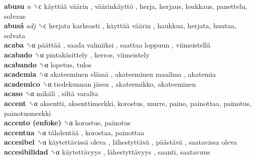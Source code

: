\textbf{abusu} \emph{n}  ␝ϲ   käyttää väärin ,  väärinkäyttö , herja, herjaus, loukkaus, panettelu, solvaus  \\
\textbf{abusá} \emph{adj}  ␝ϲ   herjata karkeasti ,  käyttää väärin , haukkua, herjata, huutaa, solvata  \\
\textbf{acaba} ␝α   päättää ,  saada valmiiksi ,  saattaa loppuun ,  viimeistellä   \\
\textbf{acabado} ␝α   pintakäsittely , kerros, viimeistely  \\
\textbf{acabando} ␝α  lopetus, tulos  \\
\textbf{academia} ␝α   akateeminen elämä ,  akateeminen maailma , akatemia  \\
\textbf{academico} ␝α   tiedekunnan jäsen , akateemikko, akateeminen  \\
\textbf{acaso} ␝α   mikäli ,  siltä varalta   \\
\textbf{accent} ␝α  aksentti, aksenttimerkki, korostus, murre, paino, painottaa, painotus, painotusmerkki  \\
\textbf{accento (enfoke)} ␝α  korostus, painotus  \\
\textbf{accentua} ␝α   tähdentää , korostaa, painottaa  \\
\textbf{accesibel} ␝α   käytettävissä oleva ,  lähestyttävä ,  päästävä ,  saatavissa oleva   \\
\textbf{accesibilidad} ␝α   käytettävyys ,  lähestyttävyys , saanti, saatavuus  \\

